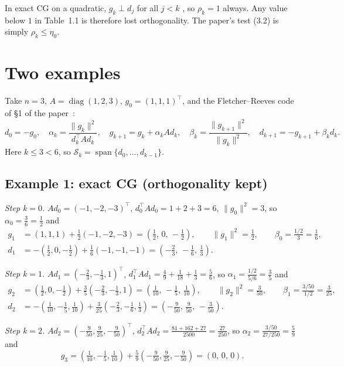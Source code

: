 \documentclass[11pt]{article}
\theoremstyle{definition}
\newcommand{\Sk}{\mathcal{S}_k}
\newcommand{\spn}{\operatorname{span}}
\begin{document}
In exact CG on a quadratic, $g_k\perp d_j$ for all $j<k$
\cite[pp.~2159--2160]{HZ13}, so $\rho_k=1$ always. Any value below $1$ in
Table~1.1 is therefore lost orthogonality. The paper's test (3.2) is simply
$\rho_k\le\eta_0$.

\section{Two examples}

Take $n=3$, $A=\operatorname{diag}(1,2,3)$, $g_0=(1,1,1)^{\top}$, and the
Fletcher--Reeves code of \S1 of the paper~\cite[p.~2152]{HZ13}:
\[
d_0=-g_0,\quad \alpha_k=\frac{\|g_k\|^2}{d_k^{\top}Ad_k},\quad
g_{k+1}=g_k+\alpha_kAd_k,\quad
\beta_k=\frac{\|g_{k+1}\|^2}{\|g_k\|^2},\quad
d_{k+1}=-g_{k+1}+\beta_kd_k .
\]
Here $k\le3<6$, so $\Sk=\spn\{d_0,\dots,d_{k-1}\}$.

\subsection*{Example 1: exact CG (orthogonality kept)}

\emph{Step $k=0$.} $Ad_0=(-1,-2,-3)^{\top}$, $d_0^{\top}Ad_0=1+2+3=6$,
$\|g_0\|^2=3$, so $\alpha_0=\tfrac36=\tfrac12$ and
\begin{align*}
g_1&=(1,1,1)+\tfrac12(-1,-2,-3)=(\tfrac12,\,0,\,-\tfrac12),
  \qquad \|g_1\|^2=\tfrac12,\qquad \beta_0=\tfrac{1/2}{3}=\tfrac16,\\
d_1&=-(\tfrac12,0,-\tfrac12)+\tfrac16(-1,-1,-1)=(-\tfrac23,\,-\tfrac16,\,\tfrac13).
\end{align*}

\emph{Step $k=1$.} $Ad_1=(-\tfrac23,-\tfrac13,1)^{\top}$,
$d_1^{\top}Ad_1=\tfrac49+\tfrac1{18}+\tfrac13=\tfrac56$, so
$\alpha_1=\tfrac{1/2}{5/6}=\tfrac35$ and
\begin{align*}
g_2&=(\tfrac12,0,-\tfrac12)+\tfrac35(-\tfrac23,-\tfrac13,1)
   =(\tfrac1{10},\,-\tfrac15,\,\tfrac1{10}),
  \qquad \|g_2\|^2=\tfrac3{50},\qquad \beta_1=\tfrac{3/50}{1/2}=\tfrac3{25},\\
d_2&=-(\tfrac1{10},-\tfrac15,\tfrac1{10})+\tfrac3{25}(-\tfrac23,-\tfrac16,\tfrac13)
   =(-\tfrac9{50},\,\tfrac9{50},\,-\tfrac3{50}).
\end{align*}

\emph{Step $k=2$.} $Ad_2=(-\tfrac9{50},\tfrac9{25},-\tfrac9{50})^{\top}$,
$d_2^{\top}Ad_2=\tfrac{81+162+27}{2500}=\tfrac{27}{250}$, so
$\alpha_2=\tfrac{3/50}{27/250}=\tfrac59$ and
\[
g_3=(\tfrac1{10},-\tfrac15,\tfrac1{10})+\tfrac59(-\tfrac9{50},\tfrac9{25},-\tfrac9{50})
=(0,\,0,\,0).
\]
\end{document}
